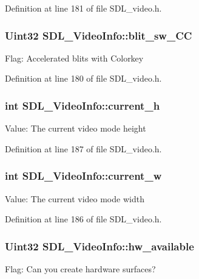 Definition at line 181 of file S\+D\+L\+\_\+video.\+h.

\hypertarget{structSDL__VideoInfo_aafaf9067d0b70d78ec9d58c32895b62e}{
\subsubsection[{blit\+\_\+sw\+\_\+\+C\+C}]{\setlength{\rightskip}{0pt plus 5cm}Uint32 S\+D\+L\+\_\+\+Video\+Info\+::blit\+\_\+sw\+\_\+\+C\+C}}\label{structSDL__VideoInfo_aafaf9067d0b70d78ec9d58c32895b62e}
Flag\+: Accelerated blits with Colorkey 

Definition at line 180 of file S\+D\+L\+\_\+video.\+h.

\hypertarget{structSDL__VideoInfo_ae797099dc83c35aa6fa9a157fee4c120}{
\subsubsection[{current\+\_\+h}]{\setlength{\rightskip}{0pt plus 5cm}int S\+D\+L\+\_\+\+Video\+Info\+::current\+\_\+h}}\label{structSDL__VideoInfo_ae797099dc83c35aa6fa9a157fee4c120}
Value\+: The current video mode height 

Definition at line 187 of file S\+D\+L\+\_\+video.\+h.

\hypertarget{structSDL__VideoInfo_add58e29175b54818092e9dea416fdc7f}{
\subsubsection[{current\+\_\+w}]{\setlength{\rightskip}{0pt plus 5cm}int S\+D\+L\+\_\+\+Video\+Info\+::current\+\_\+w}}\label{structSDL__VideoInfo_add58e29175b54818092e9dea416fdc7f}
Value\+: The current video mode width 

Definition at line 186 of file S\+D\+L\+\_\+video.\+h.

\hypertarget{structSDL__VideoInfo_a515e38f0a122a45fe67230e3929670f5}{
\subsubsection[{hw\+\_\+available}]{\setlength{\rightskip}{0pt plus 5cm}Uint32 S\+D\+L\+\_\+\+Video\+Info\+::hw\+\_\+available}}\label{structSDL__VideoInfo_a515e38f0a122a45fe67230e3929670f5}
Flag\+: Can you create hardware surfaces? 

